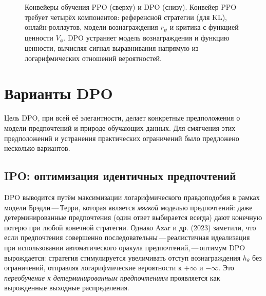 \begin{figure}[ht]
{%
}
\caption{Конвейеры обучения PPO (сверху) и DPO (снизу). Конвейер PPO требует четырёх компонентов: референсной стратегии (для KL), онлайн-роллаутов, модели вознаграждения $r_\psi$ и критика с функцией ценности $V_\phi$. DPO устраняет модель вознаграждения и функцию ценности, вычисляя сигнал выравнивания напрямую из логарифмических отношений вероятностей.}
\label{fig:dpo-vs-ppo}
\end{figure}

\section{Варианты DPO}
\label{sec:dpo-variants}

Цель DPO, при всей её элегантности, делает конкретные предположения о модели предпочтений и природе обучающих данных. Для смягчения этих предположений и устранения практических ограничений было предложено несколько вариантов.

\subsection{IPO: оптимизация идентичных предпочтений}

DPO выводится путём максимизации логарифмического правдоподобия в рамках модели Брэдли\,---\,Терри, которая является \emph{мягкой} моделью предпочтений: даже детерминированные предпочтения (один ответ выбирается всегда) дают конечную потерю при любой конечной стратегии. Однако Azar и др. (2023) заметили, что если предпочтения совершенно последовательны\,---\,реалистичная идеализация при использовании автоматического оракула предпочтений,\,---\,оптимум DPO вырождается: стратегия стимулируется увеличивать отступ вознаграждения $h_\theta$ без ограничений, отправляя логарифмические вероятности к $+\infty$ и $-\infty$. Это \emph{переобучение к детерминированным предпочтениям} проявляется как вырожденные выходные распределения.

